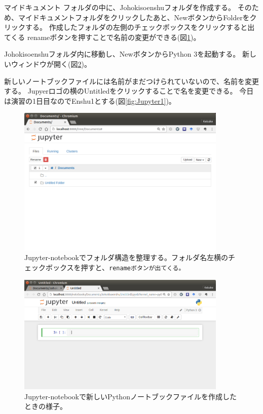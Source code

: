 マイドキュメント フォルダの中に、Johokisoenshuフォルダを作成する。
そのため、マイドキュメントフォルダをクリックしたあと、NewボタンからFolderをクリックする。
作成したフォルダの左側のチェックボックスをクリックすると出てくる renameボタンを押すことで名前の変更ができる(図\ref{fig:Jupyter_launch1})。

Johokisoenshuフォルダ内に移動し、NewボタンからPython 3を起動する。
新しいウィンドウが開く(図\ref{fig:Jupyter_launch2})。

新しいノートブックファイルには名前がまだつけられていないので、名前を変更する。
Jupyerロゴの横のUntitledをクリックすることで名を変更できる。
今日は演習の1日目なのでEnshu1とする(図\ref{fig:Jupyter1})。


\begin{figure}
	\centering
	\includegraphics[width=10cm]{TeX_files/fig_python_install/Jupyter-launch1.png}
	\caption{
		\label{fig:Jupyter_launch1}
		Jupyter-notebookでフォルダ構造を整理する。フォルダ名左横のチェックボックスを押すと、\tt{rename}ボタンが出てくる。
	}
\end{figure}

\begin{figure}
	\centering
	\includegraphics[width=10cm]{TeX_files/fig_python_install/Jupyter_launch2.png}
	\caption{
		\label{fig:Jupyter_launch2}
		Jupyter-notebookで新しいPythonノートブックファイルを作成したときの様子。
	}
\end{figure}

